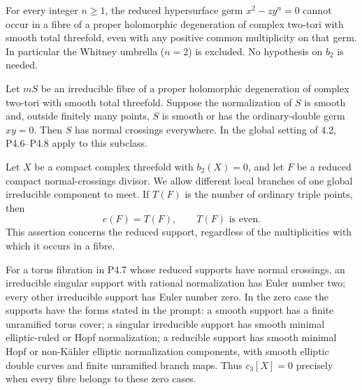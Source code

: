
\begin{proposition}[P4.16]\hypertarget{tag-02WN}{}\label{night:P4.16}\label{stmt:P4.16}


For every integer $n\geq1$, the reduced hypersurface germ
$x^2-zy^n=0$ cannot occur in a fibre of a proper holomorphic
degeneration of complex two-tori with smooth total threefold,
even with any positive common multiplicity on that germ.
In particular the Whitney umbrella ($n=2$) is excluded.
No hypothesis on $b_2$ is needed.
\end{proposition}

\begin{proposition}[P4.20]\hypertarget{tag-02WS}{}\label{night:P4.20}\label{stmt:P4.20}


Let $mS$ be an irreducible fibre of a proper holomorphic
degeneration of complex two-tori with smooth total threefold.
Suppose the normalization of $S$ is smooth and, outside
finitely many points, $S$ is smooth or has the ordinary-double
germ $xy=0$. Then $S$ has normal crossings everywhere.
In the global setting of 4.2, P4.6--P4.8 apply to this subclass.
\end{proposition}

\begin{proposition}[P4.6]\hypertarget{tag-02XY}{}\label{night:P4.6}\label{stmt:P4.6}


Let $X$ be a compact complex threefold with $b_2(X)=0$, and let $F$ be a
reduced compact normal-crossings divisor. We allow different local
branches of one global irreducible component to meet. If $T(F)$ is the
number of ordinary triple points, then
\[
 e(F)=T(F),\qquad T(F)\text{ is even}.
\]
This assertion concerns the reduced support, regardless of the
multiplicities with which it occurs in a fibre.
\end{proposition}

\begin{proposition}[P4.8]\hypertarget{tag-02Y0}{}\label{night:P4.8}\label{stmt:P4.8}


For a torus fibration in P4.7 whose reduced supports have normal
crossings, an irreducible singular support with
rational normalization has Euler number two; every other irreducible
support has Euler number zero. In the zero case the supports have the
forms stated in the prompt: a smooth support has a finite unramified
torus cover; a singular irreducible support has smooth minimal
elliptic-ruled or Hopf normalization; a reducible support has smooth
minimal Hopf or non-Kähler elliptic normalization components, with
smooth elliptic double curves and finite unramified branch maps.
Thus $c_3[X]=0$ precisely when every fibre belongs to these zero cases.
\end{proposition}

